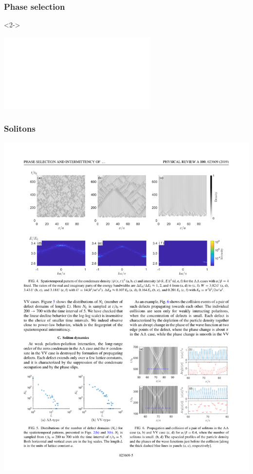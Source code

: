 \documentclass[9pt]{beamer}
\begin{document}
\begin{frame}[t]
\frametitle{Phase selection}
\begin{onlyenv}<2->
\begin{center}
\includegraphics<2>[width=1.\textwidth]{./fig/ch3_2.pdf}
\end{center}
\end{onlyenv}
\end{frame}

\begin{frame}[t]
\frametitle{Solitons}
\includegraphics[width=.95\textwidth]{./fig/ch3_4.pdf}
\end{frame}

%
%
\end{document}
